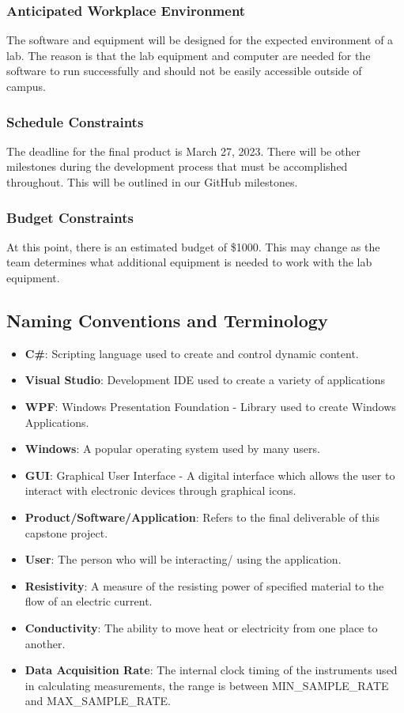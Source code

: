 \documentclass[12pt, titlepage]{article}
\begin{document}
\subsubsection{Anticipated Workplace Environment}
The software and equipment will be designed for the expected environment of a lab. The reason is that the lab equipment and computer are needed for the software to run successfully and
should not be easily accessible outside of campus. 

\subsubsection{Schedule Constraints}
The deadline for the final product is March 27, 2023. There will be other milestones during the development process that must be accomplished throughout. 
This will be outlined in our GitHub milestones.


\subsubsection{Budget Constraints}
At this point, there is an estimated budget of \$1000. This may change as the team determines what additional equipment is needed to work with the lab equipment.

\subsection{Naming Conventions and Terminology}

\begin{itemize}
    \item \textbf{C\#}: Scripting language used to create and control dynamic content.
    \item \textbf{Visual Studio}: Development IDE used to create a variety of applications
    \item \textbf{WPF}: Windows Presentation Foundation - Library used to create Windows Applications.
    \item \textbf{Windows}: A popular operating system used by many users.
    \item \textbf{GUI}: Graphical User Interface - A digital interface which allows the user to interact with electronic devices through graphical icons.
    \item \textbf{Product/Software/Application}: Refers to the final deliverable of this capstone project.
    \item \textbf{User}: The person who will be interacting/ using the application.
    \item \textbf{Resistivity}: A measure of the resisting power of specified material to the flow of an electric current.
    \item \textbf{Conductivity}: The ability to move heat or electricity from one place to another.
    \item \textbf{Data Acquisition Rate}: The internal clock timing of the instruments used in calculating measurements, the range is between MIN\_SAMPLE\_RATE and MAX\_SAMPLE\_RATE.
\end{itemize}
\end{document}
